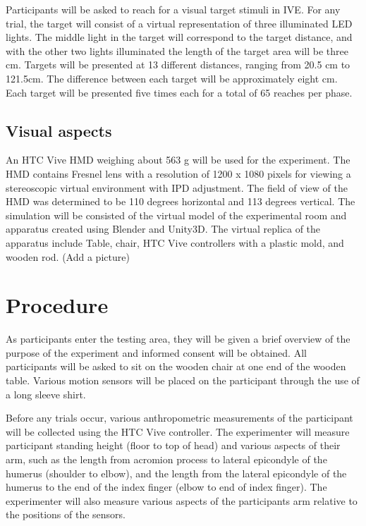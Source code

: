 Participants will be asked to reach for a visual target stimuli in IVE. For any trial, the target will consist of a virtual representation of three illuminated LED lights. The middle light in the target will correspond to the target distance, and with the other two lights illuminated the length of the target area will be three cm. Targets will be presented at 13 different distances, ranging from 20.5 cm to 121.5cm. The difference between each target will be approximately eight cm. Each target will be presented five times each for a total of 65 reaches per phase. 

\subsection{Visual aspects}
An HTC Vive HMD weighing about 563 g will be used for the experiment. The HMD contains Fresnel lens with a resolution of 1200 x 1080 pixels for viewing a stereoscopic virtual environment with IPD adjustment. The field of view of the HMD was determined to be 110 degrees horizontal and 113 degrees vertical. The simulation will be consisted of the virtual model of the experimental room and apparatus created using Blender and Unity3D. The virtual replica of the apparatus include Table, chair, HTC Vive controllers with a plastic mold, and wooden rod. (Add a picture) %

\section{Procedure}
As participants enter the testing area, they will be given a brief overview of the purpose of the experiment and informed consent will be obtained. All participants will be asked to sit on the wooden chair at one end of the wooden table. Various motion sensors will be placed on the participant through the use of a long sleeve shirt. 

Before any trials occur, various anthropometric measurements of the participant will be collected using the HTC Vive controller. The experimenter will measure participant standing height (floor to top of head) and various aspects of their arm, such as the length from acromion process to lateral epicondyle of the humerus (shoulder to elbow), and the length from the lateral epicondyle of the humerus to the end of the index finger (elbow to end of index finger). The experimenter will also measure various aspects of the participants arm relative to the positions of the sensors. %

